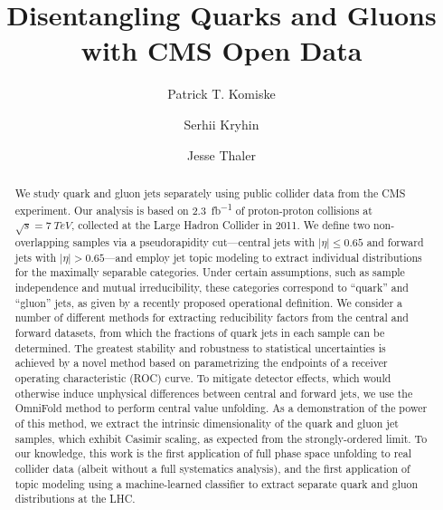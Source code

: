 \documentclass[aps,prd,twocolumn,preprintnumbers,nofootinbib,longbibliography,floatfix]{revtex4-1}
\newcommand{\OmniFold}{{\sc OmniFold}\xspace}
\newcommand{\cor}[1]{#1}
\begin{document}
\title{Disentangling Quarks and Gluons with CMS Open Data}

\author{Patrick T. Komiske}

\author{Serhii Kryhin}


\author{Jesse Thaler}


\begin{abstract}
%
We study quark and gluon jets separately using public collider data from the CMS experiment.
%
Our analysis is based on \SI{2.3}{fb^{-1}} of proton-proton collisions at $\sqrt{s}=\SI{7}{TeV}$, collected at the Large Hadron Collider in 2011.
%
We define two non-overlapping samples via a pseudorapidity cut---central jets with $|\eta|\le0.65$ and forward jets with $|\eta|>0.65$---and employ jet topic modeling to extract individual distributions for the maximally separable categories.
%
Under certain assumptions, such as sample independence and mutual irreducibility, these categories correspond to ``quark'' and ``gluon'' jets, as given by a recently proposed operational definition.
%
We consider a number of different methods for extracting reducibility factors from the central and forward datasets, from which the fractions of quark jets in each sample can be determined.
%
The greatest stability and robustness to statistical uncertainties is achieved by a novel method based on parametrizing the endpoints of a receiver operating characteristic (ROC) curve.
%
To mitigate detector effects, which would otherwise induce unphysical differences between central and forward jets, we use the \OmniFold method to perform central value unfolding.
%
As a demonstration of the power of this method, we extract the intrinsic dimensionality of the quark and gluon jet samples, which exhibit Casimir scaling, as expected from the strongly-ordered limit. 
%
To our knowledge, this work is the first application of full phase space unfolding to real collider data \cor{(albeit without a full systematics analysis)}, and 
\cor{the first application of topic modeling using a machine-learned classifier} to extract separate quark and gluon distributions at the LHC.
%
\end{abstract}
\end{document}
